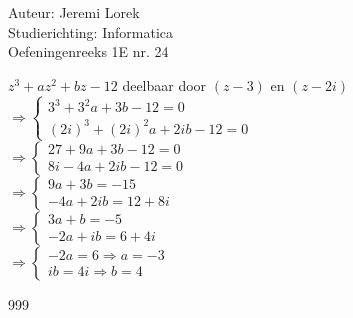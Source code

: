\documentclass[a4paper]{article}
\begin{document}
  
\noindent \large Auteur: Jeremi Lorek\\
\noindent \large Studierichting: Informatica\\
\noindent \large Oefeningenreeks 1E nr. 24\\

\medskip
\normalsize

$z^3 + az^2 + bz - 12$ deelbaar door $(z-3)$ en $(z-2i)$  \\

$\Rightarrow \left\{ \begin{array}{l} 3^3 + 3^2 a + 3b - 12 = 0 \\ (2i)^3 + (2i)^2 a + 2i b - 12 = 0 \end{array} \right.$  \\

$\Rightarrow \left\{ \begin{array}{l} 27 + 9a + 3b - 12 = 0 \\ 8i - 4a + 2ib - 12 = 0 \end{array} \right.$  \\

$\Rightarrow \left\{ \begin{array}{l} 9a + 3b = -15 \\ -4a + 2ib = 12 + 8i \end{array} \right.$  \\

$\Rightarrow \left\{ \begin{array}{l} 3a + b = -5 \\ -2a + ib = 6 + 4i \end{array} \right.$  \\

$\Rightarrow \left\{ \begin{array}{l} -2a = 6 \Rightarrow a = -3 \\ ib = 4i \Rightarrow b = 4 \end{array} \right.$  \\



\begin{thebibliography}{999}
\end{thebibliography}
\end{document}
